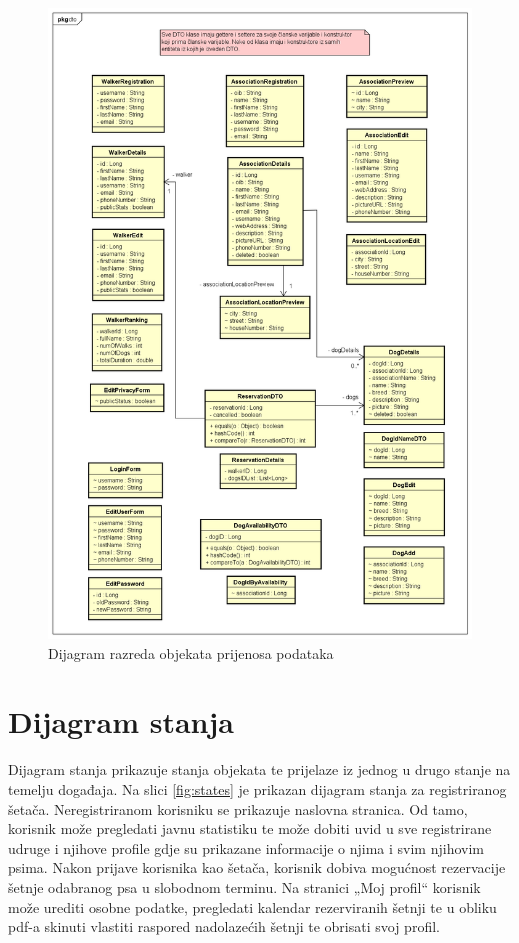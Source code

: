 		    \begin{figure}[H]
    			    \includegraphics[scale=0.47]{dijagrami/classdiagram-rest-dto.png}
    			    \centering
    			    \caption{Dijagram razreda objekata prijenosa podataka}
    			    \label{fig:classdiagram-rest-dto}
		    \end{figure}
			
			\eject
		
		\section{Dijagram stanja}
			
			Dijagram stanja prikazuje stanja objekata te prijelaze iz jednog u drugo stanje na temelju događaja.
Na slici \ref{fig:states} je prikazan dijagram stanja za registriranog šetača. 
Neregistriranom korisniku se prikazuje naslovna stranica. Od tamo, korisnik može pregledati javnu statistiku te može dobiti uvid u sve registrirane udruge i njihove profile gdje su prikazane informacije o njima i svim njihovim psima.
Nakon prijave korisnika kao šetača, korisnik dobiva mogućnost rezervacije šetnje odabranog psa u slobodnom terminu. Na stranici „Moj profil“ korisnik može urediti osobne podatke, pregledati kalendar rezerviranih šetnji te u obliku pdf-a skinuti vlastiti raspored nadolazećih šetnji te obrisati svoj profil.

